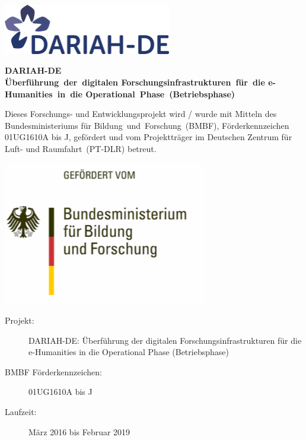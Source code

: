 \includegraphics[width=0.55\textwidth]{img/dariah-logo.png}
\vspace{20mm}
\maketitle
\vspace{5mm}
\begin{center}
\begin{LARGE}
\noindent\textbf{DARIAH-DE\\\vspace{3mm}Überführung~der~digitalen Forschungsinfrastrukturen~für~die e-Humanities~in~die Operational~Phase~(Betriebsphase)}
\end{LARGE}
\bigskip\bigskip
\vspace{10mm}

\begin{small}
\noindent Dieses Forschungs- und Entwicklungsprojekt wird / wurde mit Mitteln des Bundesministeriums für Bildung~und~Forschung~(BMBF), Förderkennzeichen 01UG1610A bis J, gefördert und vom Projektträger im Deutschen Zentrum für Luft- und Raumfahrt~(PT-DLR) betreut.\\
\end{small}
\vspace{20mm}
\includegraphics{img/bmbf.png}
\end{center}
\restoregeometry
\newpage
\normalsize
\begin{description}
\item[Projekt:] DARIAH-DE: Überführung der digitalen Forschungsinfrastrukturen für die e-Humanities in die Operational Phase (Betriebsphase)
\item[BMBF Förderkennzeichen:] 01UG1610A bis J
\item[Laufzeit:] März 2016 bis Februar 2019
\end{description}

